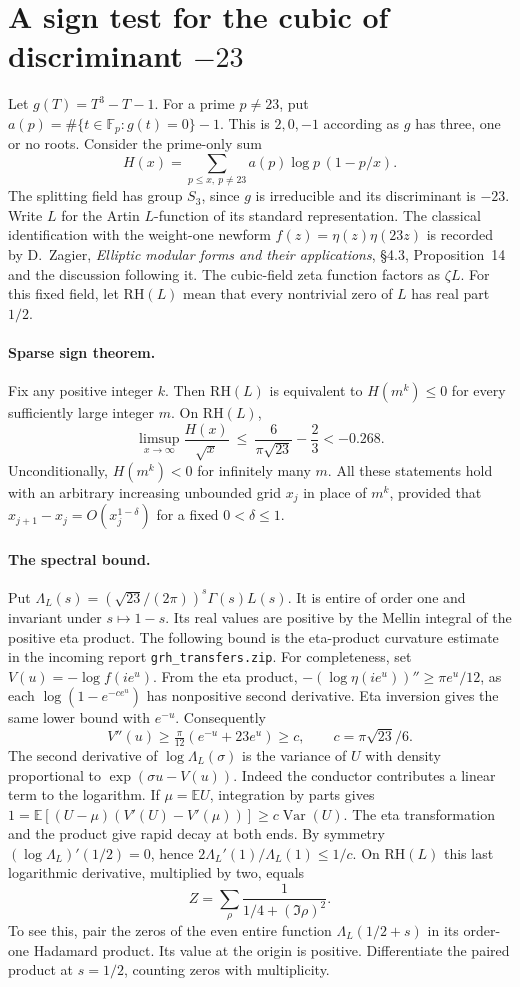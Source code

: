 \section{A sign test for the cubic of discriminant $-23$}
Let $g(T)=T^3-T-1$. For a prime $p\ne23$, put
$a(p)=\#\{t\in\mathbb F_p:g(t)=0\}-1$. This is $2,0,-1$ according
as $g$ has three, one or no roots. Consider the prime-only sum
\[
 H(x)=\sum_{p\le x,\ p\ne23}a(p)\log p\,(1-p/x).
\]
The splitting field has group $S_3$, since $g$ is irreducible and
its discriminant is $-23$. Write $L$ for the Artin $L$-function of
its standard representation. The classical identification with the
weight-one newform $f(z)=\eta(z)\eta(23z)$ is recorded by
D.~Zagier, \emph{Elliptic modular forms and their applications},
\S4.3, Proposition~14 and the discussion following it.
The cubic-field zeta function factors as $\zeta L$.
For this fixed field, let $\mathrm{RH}(L)$ mean that every nontrivial zero
of $L$ has real part $1/2$.

\paragraph{Sparse sign theorem.}
Fix any positive integer $k$. Then $\mathrm{RH}(L)$ is equivalent to
$H(m^k)\le0$ for every sufficiently large integer $m$.
On $\mathrm{RH}(L)$,
\[
 \limsup_{x\to\infty}\frac{H(x)}{\sqrt{x}}
 \ \le\ \frac{6}{\pi\sqrt{23}}-\frac23 < -0.268 .
\]
Unconditionally, $H(m^k)<0$ for infinitely many $m$.
All these statements hold with an arbitrary increasing unbounded grid
$x_j$ in place of $m^k$, provided that $x_{j+1}-x_j=O(x_j^{1-\delta})$
for a fixed $0<\delta\le1$.

\paragraph{The spectral bound.}
Put $\Lambda_L(s)=(\sqrt{23}/(2\pi))^s\Gamma(s)L(s)$.
It is entire of order one and invariant under $s\mapsto1-s$. Its real
values are positive by the Mellin integral of the positive eta product.
The following bound is the eta-product curvature estimate in the incoming
report \texttt{grh\_transfers.zip}. For completeness, set
$V(u)=-\log f(i e^u)$. From the eta product,
$-(\log\eta(i e^u))''\ge\pi e^u/12$, as each
$\log(1-e^{-c e^u})$ has nonpositive second derivative.
Eta inversion gives the same lower bound with $e^{-u}$.
Consequently
\[
 V''(u)\ge\tfrac\pi{12}(e^{-u}+23e^u)\ge c,\qquad c=\pi\sqrt{23}/6.
\]
The second derivative of $\log\Lambda_L(\sigma)$ is the variance of
$U$ with density proportional to $\exp(\sigma u-V(u))$. Indeed the
conductor contributes a linear term to the logarithm. If $\mu=\mathbb E U$,
integration by parts gives
$1=\mathbb E[(U-\mu)(V'(U)-V'(\mu))]\ge c\operatorname{Var}(U)$.
The eta transformation and the product give rapid decay at both ends.
By symmetry $(\log\Lambda_L)'(1/2)=0$, hence
$2\Lambda_L'(1)/\Lambda_L(1)\le 1/c$.
On $\mathrm{RH}(L)$ this last logarithmic derivative, multiplied by two,
equals
\[
 Z=\sum_{\rho}\frac{1}{1/4+(\Im\rho)^2}.
\]
To see this, pair the zeros of the even entire function
$\Lambda_L(1/2+s)$ in its order-one Hadamard product.
Its value at the origin is positive. Differentiate the paired product at
$s=1/2$, counting zeros with multiplicity.

